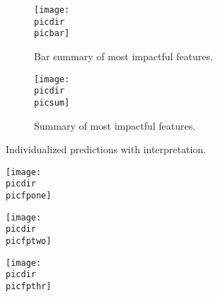 \begin{figure}
\begin{adjustbox}{minipage={\linewidth},frame}
\begin{subfigure}[t]{.45\linewidth}
    \vspace{2.5mm}
    \centering
    \captionsetup[subfigure]{}
    \caption{Bar summary of most impactful features.}\label{fig:shapsumbar30d}
    \texttt{[image: \\picdir\\picbar]}
\end{subfigure}
\begin{subfigure}[t]{.45\linewidth}
    \vspace{2.5mm}
    \centering
    \captionsetup[subfigure]{}
    \caption{Summary of most impactful features.}\label{fig:shapsum30d}
    \vspace{-2.3mm}
    \texttt{[image: \\picdir\\picsum]}
    \vspace{2.0mm}
\end{subfigure}
\textsf{Individualized predictions with interpretation.}
\vspace{-2.5mm}
\begin{subfigure}[t]{0.1\textwidth}
    \caption{}\label{fig:shapforce30d1}
    \end{subfigure}%
    \begin{minipage}[c]{0.9\textwidth}
    \texttt{[image: \\picdir\\picfpone]}
    \vspace{-2.5mm}
\end{minipage}
\begin{subfigure}[t]{0.1\textwidth}
    \caption{}\label{fig:shapforce30d2}
    \end{subfigure}%
    \begin{minipage}[c]{0.9\textwidth}
    \texttt{[image: \\picdir\\picfptwo]}
    \vspace{-3.5mm}
\end{minipage}
\vspace{-4.5mm}
\begin{subfigure}[t]{0.1\textwidth}
    \caption{}\label{fig:shapforce30d3}
    \end{subfigure}%
    \begin{minipage}[c]{0.9\textwidth}
    \texttt{[image: \\picdir\\picfpthr]}
    \vspace{-2.5mm}
\end{minipage}
\vspace{-2.5mm}


\end{adjustbox}
\end{figure}
